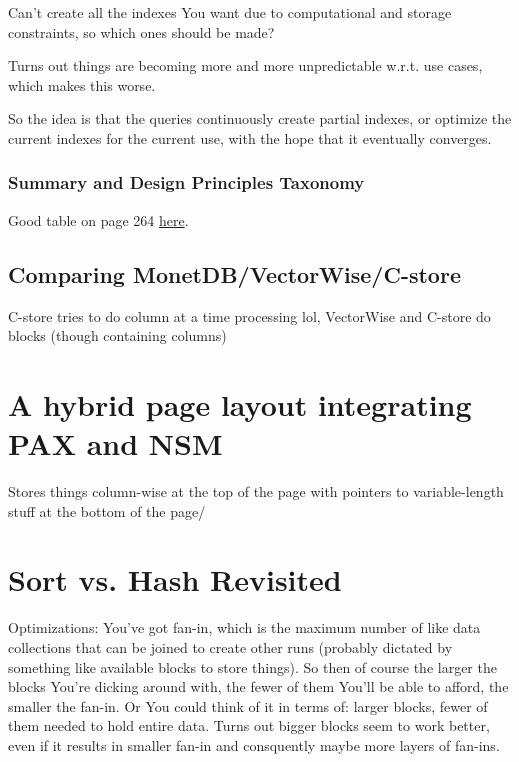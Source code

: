 \documentclass{article}
\begin{document}
			Can't create all the indexes You want due to computational and storage constraints, so which ones should be made?
			
			Turns out things are becoming more and more unpredictable w.r.t. use cases, which makes this worse.
			
			So the idea is that the queries continuously create partial indexes, or optimize the current indexes for the current use, with the hope that it eventually converges.
			
		\subsubsection{Summary and Design Principles Taxonomy}
		
			Good table on page 264 \href{https://stratos.seas.harvard.edu/files/stratos/files/columnstoresfntdbs.pdf}{here}.
	
	\subsection{Comparing MonetDB/VectorWise/C-store}
	
		C-store tries to do column at a time processing lol, VectorWise and C-store do blocks (though containing columns)
		
		
\newpage
\section{A hybrid page layout integrating PAX and NSM}

	Stores things column-wise at the top of the page with pointers to variable-length stuff at the bottom of the page/
			
		
		
		
			
			
		
	
		
		
		
		
		
		
		
		
		
		
\newpage
\section{Sort vs. Hash Revisited }

	Optimizations: You've got fan-in, which is the maximum number of like data collections that can be joined to create other runs (probably dictated by something like available blocks to store things). So then of course the larger the blocks You're dicking around with, the fewer of them You'll be able to afford, the smaller the fan-in. Or You could think of it in terms of: larger blocks, fewer of them needed to hold entire data. Turns out bigger blocks seem to work better, even if it results in smaller fan-in and consquently maybe more layers of fan-ins.
		
\end{document}
